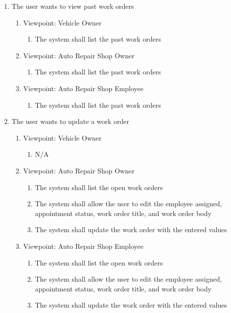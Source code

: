 \documentclass[12pt]{article}
\begin{document}
\begin{enumerate}[resume*=business_events]
	\item The user wants to view past work orders
	      \begin{enumerate}[VP\arabic*.]
		      \item Viewpoint: Vehicle Owner
		            \begin{enumerate}
			            \item The system shall list the past work orders
		            \end{enumerate}
		      \item Viewpoint: Auto Repair Shop Owner
		            \begin{enumerate}
			            \item The system shall list the past work orders
		            \end{enumerate}
		      \item Viewpoint: Auto Repair Shop Employee
		            \begin{enumerate}
			            \item The system shall list the past work orders
		            \end{enumerate}
	      \end{enumerate}

	\item The user wants to update a work order
	      \begin{enumerate}[VP\arabic*.]
		      \item Viewpoint: Vehicle Owner
		            \begin{enumerate}
			            \item[] N/A
		            \end{enumerate}
		      \item Viewpoint: Auto Repair Shop Owner
		            \begin{enumerate}
			            \item The system shall list the open work orders
			            \item The system shall allow the user to edit the employee assigned, appointment status, work order
			                  title, and work order body
			            \item The system shall update the work order with the entered values
		            \end{enumerate}
		      \item Viewpoint: Auto Repair Shop Employee
		            \begin{enumerate}
			            \item The system shall list the open work orders
			            \item The system shall allow the user to edit the employee assigned, appointment status, work order
			                  title, and work order body
			            \item The system shall update the work order with the entered values
		            \end{enumerate}
	      \end{enumerate}
\end{enumerate}
\end{document}
